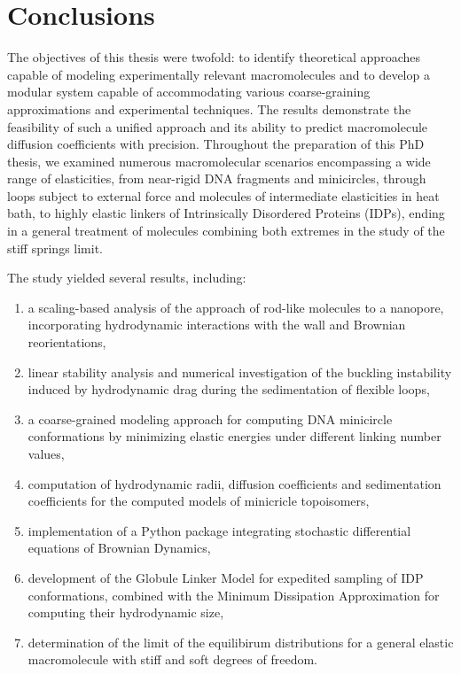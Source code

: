\documentclass{doctoral}
\begin{document}
\chapter{Conclusions}

The objectives of this thesis were twofold: to identify theoretical approaches capable of modeling experimentally relevant macromolecules and to develop a modular system capable of accommodating various coarse-graining approximations and experimental techniques.
The results demonstrate the feasibility of such a unified approach and its ability to predict macromolecule diffusion coefficients with precision.
Throughout the preparation of this PhD thesis, we examined numerous macromolecular scenarios encompassing a wide range of elasticities, from near-rigid DNA fragments and minicircles, through loops subject to external force and molecules of intermediate elasticities in heat bath, to highly elastic linkers of Intrinsically Disordered Proteins (IDPs), ending in a general treatment of molecules combining both extremes in the study of the stiff springs limit.

The study yielded several results, including:
\begin{enumerate}
    \item a scaling-based analysis of the approach of rod-like molecules to a nanopore, incorporating hydrodynamic interactions with the wall and Brownian reorientations, \item linear stability analysis and numerical investigation of the buckling instability induced by hydrodynamic drag during the sedimentation of flexible loops, \item a coarse-grained modeling approach for computing DNA minicircle conformations by minimizing elastic energies under different linking number values, \item computation of hydrodynamic radii, diffusion coefficients and sedimentation coefficients for the computed models of minicricle topoisomers, \item implementation of a Python package integrating stochastic differential equations of Brownian Dynamics, \item development of the Globule Linker Model for expedited sampling of IDP conformations, combined with the Minimum Dissipation Approximation for computing their hydrodynamic size, \item determination of the limit of the equilibirum distributions for a general elastic macromolecule with stiff and soft degrees of freedom.
\end{enumerate}
\end{document}

